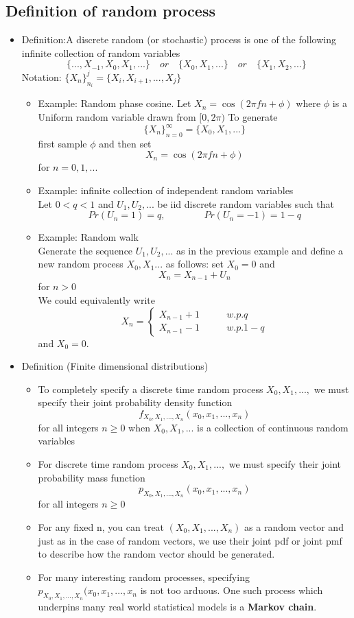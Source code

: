 \documentclass[12pt]{article}
\begin{document}
\subsection{Definition of random process}
\begin{itemize}
\item Definition:A discrete random (or stochastic) process is one of the following infinite collection of random variables
\[
\{...,X_{-1},X_0,X_1,... \} \quad or \quad \{ X_0,X_1,...\} \quad or \quad \{ X_1,X_2,... \} 
\]
Notation: $\{ X_n\}_{n_i}^j = \{X_i,X_{i+1},...,X_j\}$
\begin{itemize}
\item Example: Random phase cosine. Let $X_n=\cos(2\pi fn + \phi)$ where $\phi$ is a Uniform random variable drawn from $[0,2\pi)$
To generate 
\[
\{ X_n\}_{n=0}^\infty = \{X_0,X_{1},...\}
\] 
first sample $\phi$ and then set 
\[
X_n = \cos(2\pi fn + \phi)
\]
for $n=0,1,...$\\

\item Example: infinite collection of independent random variables \\
Let $0<q<1$ and $U_1,U_2,...$ be iid discrete random variables such that 
\[
Pr(U_n=1)=q, \qquad \qquad Pr(U_n=-1)=1-q
\]
\item Example: Random walk\\
Generate the sequence $U_1,U_2,...$ as in the previous example and define a new random process $X_0,X_1...$ as follows: set $X_0=0$ and 
\[
X_n = X_{n-1}+U_n
\]
for $n > 0$\\
We could equivalently write
  \[
    X_n=\left\{
                \begin{array}{ll}
                 X_{n-1} + 1   \qquad &w.p. q\\
                 X_{n-1} - 1   \qquad &w.p. 1-q
                \end{array}
              \right.
  \]
and $X_0=0.$
\end{itemize}
\item Definition (Finite dimensional distributions)
\begin{itemize}
\item To completely specify a discrete time random process $X_0,X_1,...,$ we must specify their joint probability density function
$$f_{X_0,X_1,...,X_n}(x_0,x_1,...,x_n)$$
for all integers $n\ge 0$ when $X_0,X_1,...$ is a collection of continuous random variables 
\item For discrete time random process $X_0,X_1,...,$ we must specify their joint probability mass function
$$p_{X_0,X_1,...,X_n}(x_0,x_1,...,x_n)$$
for all integers $n \ge 0$
\item For any fixed n, you can treat $(X_0,X_1,...,X_n)$ as a random vector and just as in the case of random vectors, we use their joint pdf or joint pmf to describe how the random vector should be generated.
\item For many interesting random processes, specifying $p_{X_0,X_1,...,X_n}(x_0,x_1,...,x_n$ is not too arduous. One such process which underpins many real world statistical models is a \textbf{Markov chain}.
\end{itemize}

\end{itemize} 
\end{document}

